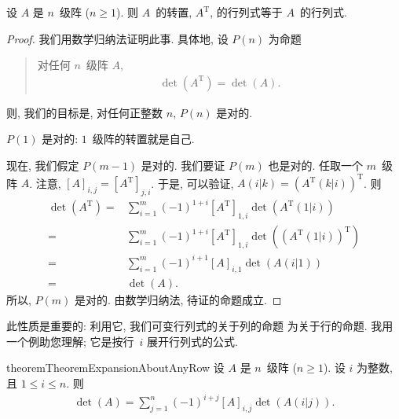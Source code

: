 \documentclass[../libro.tex]{subfiles}
\begin{document}
\begin{theorem}
    设 \(A\) 是 \(n\)~级阵 (\(n \geq 1\)).
    则 \(A\)~的转置, \(A^{\mathrm{T}}\),
    的行列式等于 \(A\)~的行列式.
\end{theorem}

\begin{proof}
    我们用数学归纳法证明此事.
    具体地, 设 \(P(n)\) 为命题
    \begin{quotation}
        对任何 \(n\)~级阵 \(A\),
        \begin{align*}
            \det {(A^{\mathrm{T}})} = \det {(A)}.
        \end{align*}
    \end{quotation}
    则, 我们的目标是,
    对任何正整数 \(n\), \(P(n)\) 是对的.

    \(P(1)\) 是对的:
    \(1\)~级阵的转置就是自己.

    现在, 我们假定 \(P(m-1)\) 是对的.
    我们要证 \(P(m)\) 也是对的.
    任取一个 \(m\)~级阵 \(A\).
    注意, \([A]_{i,j} = [A^{\mathrm{T}}]_{j,i}\).
    于是, 可以验证,
    \(A(i|k) = (A^{\mathrm{T}}(k|i))^{\mathrm{T}}\).
    则
    \begin{align*}
        \det {(A^{\mathrm{T}})}
        = {} & \sum_{i = 1}^{m} {
            (-1)^{1+i} [A^{\mathrm{T}}]_{1,i}
            \det {(A^{\mathrm{T}}(1|i))}
        }
        \\
        = {} & \sum_{i = 1}^{m} {
            (-1)^{1+i} [A^{\mathrm{T}}]_{1,i}
            \det {((A^{\mathrm{T}}(1|i))^{\mathrm{T}})}
        }
        \\
        = {} & \sum_{i = 1}^{m} {
            (-1)^{i+1} [A]_{i,1}
            \det {(A(i|1))}
        }
        \\
        = {} & \det {(A)}.
    \end{align*}
    所以, \(P(m)\) 是对的.
    由数学归纳法, 待证的命题成立.
\end{proof}

此性质是重要的:
利用它,
我们可变行列式的关于列的命题%
为关于行的命题.
我用一个例助您理解;
它是按行~\(i\) 展开行列式的公式.

\begin{restatable}{theorem}{TheoremExpansionAboutAnyRow}
    设 \(A\) 是 \(n\)~级阵 (\(n \geq 1\)).
    设 \(i\) 为整数, 且 \(1 \leq i \leq n\).
    则
    \begin{align*}
        \det {(A)}
        = \sum_{j = 1}^{n} {(-1)^{i+j} [A]_{i,j} \det {(A(i|j))}}.
    \end{align*}
\end{restatable}
\end{document}
